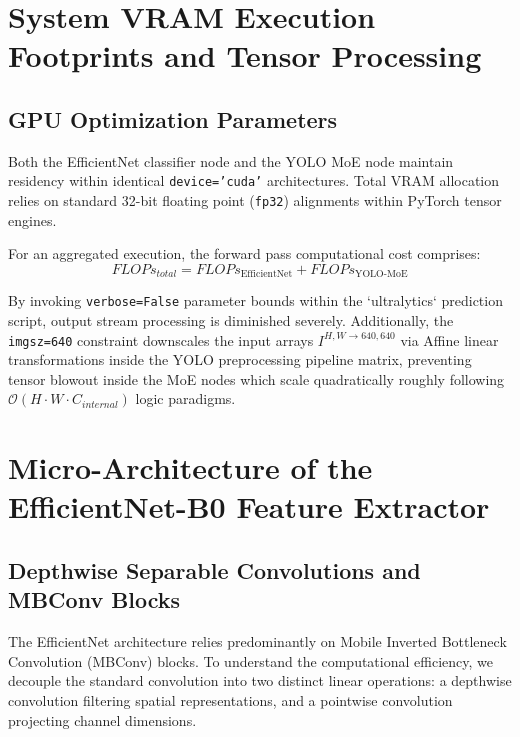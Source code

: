 \documentclass[11pt, letterpaper, oneside, openany]{book}
\begin{document}
\chapter{System VRAM Execution Footprints and Tensor Processing}

\section{GPU Optimization Parameters}
Both the EfficientNet classifier node and the YOLO MoE node maintain residency within identical \texttt{device='cuda'} architectures. Total VRAM allocation relies on standard 32-bit floating point (\texttt{fp32}) alignments within PyTorch tensor engines.

For an aggregated execution, the forward pass computational cost comprises:
\begin{equation}
    FLOPs_{total} = FLOPs_{\text{EfficientNet}} + FLOPs_{\text{YOLO-MoE}}
\end{equation}

By invoking \texttt{verbose=False} parameter bounds within the `ultralytics` prediction script, output stream processing is diminished severely. Additionally, the \texttt{imgsz=640} constraint downscales the input arrays $I^{H,W \to 640,640}$ via Affine linear transformations inside the YOLO preprocessing pipeline matrix, preventing tensor blowout inside the MoE nodes which scale quadratically roughly following $\mathcal{O}(H \cdot W \cdot C_{internal})$ logic paradigms.

\chapter{Micro-Architecture of the EfficientNet-B0 Feature Extractor}

\section{Depthwise Separable Convolutions and MBConv Blocks}
The EfficientNet architecture relies predominantly on Mobile Inverted Bottleneck Convolution (MBConv) blocks. To understand the computational efficiency, we decouple the standard convolution into two distinct linear operations: a depthwise convolution filtering spatial representations, and a pointwise convolution projecting channel dimensions.
\end{document}
